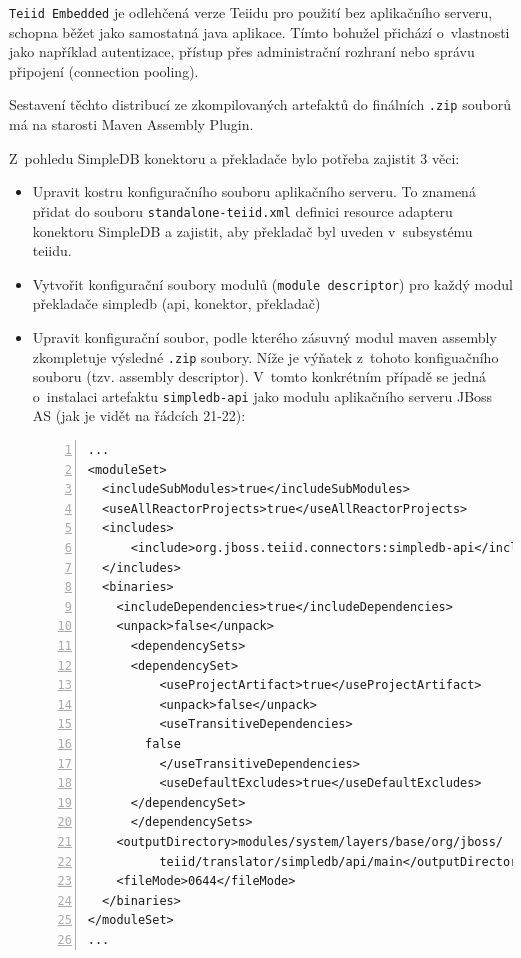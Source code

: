 \documentclass[oneside,12pt,final]{fithesis2}
\begin{document}
\texttt{Teiid Embedded} je odlehčená verze Teiidu pro použití bez aplikačního serveru, schopna běžet jako samostatná java aplikace. Tímto bohužel přichází o~vlastnosti jako například autentizace, přístup přes administrační rozhraní  nebo správu připojení (connection pooling).

Sestavení těchto distribucí ze zkompilovaných artefaktů do finálních \texttt{.zip} souborů má na starosti Maven Assembly Plugin. 

Z~pohledu SimpleDB konektoru a překladače bylo potřeba zajistit 3 věci:

\begin{itemize}
 \item Upravit kostru konfiguračního souboru aplikačního serveru. To znamená přidat do souboru \texttt{standalone-teiid.xml} definici resource adapteru konektoru SimpleDB a zajistit, aby překladač byl uveden v~subsystému teiidu.
 \item Vytvořit konfigurační soubory modulů (\texttt{module descriptor}) pro každý modul překladače simpledb (api, konektor, překladač)
 \item Upravit konfigurační soubor, podle kterého zásuvný modul maven assembly zkompletuje výsledné \texttt{.zip} soubory. Níže je výňatek z~tohoto konfiguačního souboru (tzv. assembly descriptor). V~tomto konkrétním případě se jedná o~instalaci artefaktu \texttt{simpledb-api} jako modulu aplikačního serveru JBoss AS (jak je vidět na řádcích 21-22):
 \begin{Verbatim}[fontsize=\small,numbers=left]
...
<moduleSet>
  <includeSubModules>true</includeSubModules>
  <useAllReactorProjects>true</useAllReactorProjects>
  <includes>
      <include>org.jboss.teiid.connectors:simpledb-api</include>
  </includes>
  <binaries>        
    <includeDependencies>true</includeDependencies>
    <unpack>false</unpack>
      <dependencySets>
	  <dependencySet>
	      <useProjectArtifact>true</useProjectArtifact>
	      <unpack>false</unpack>
	      <useTransitiveDependencies>
		false
	      </useTransitiveDependencies>
	      <useDefaultExcludes>true</useDefaultExcludes>
	  </dependencySet>
      </dependencySets>          
    <outputDirectory>modules/system/layers/base/org/jboss/
	      teiid/translator/simpledb/api/main</outputDirectory>
    <fileMode>0644</fileMode>
  </binaries>
</moduleSet>  
...
\end{Verbatim}
    
\end{itemize}
\end{document}
